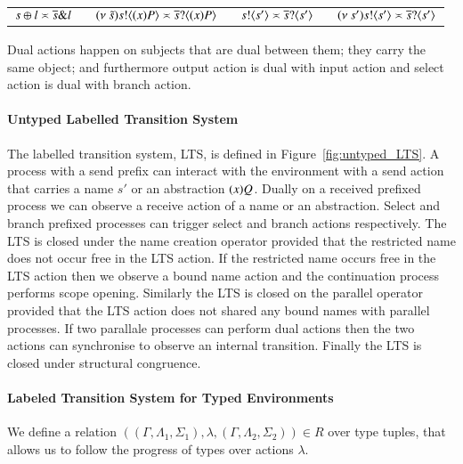 \begin{tabular}{c}
	$s \oplus l \asymp \overline{s} \& l
	\qquad (\nu\ \tilde{s}) s ! \langle (x)P \rangle \asymp \overline{s} ? \langle (x)P \rangle
	\qquad s ! \langle s' \rangle \asymp \overline{s} ? \langle s' \rangle
	\qquad (\nu\ s') s ! \langle s' \rangle \asymp \overline{s} ? \langle s' \rangle$
\end{tabular}

Dual actions happen on subjects that are dual between them; they carry the same
object; and furthermore output action is dual with input action and 
select action is dual with branch action.

\paragraph{Untyped Labelled Transition System}



The labelled transition system, LTS, is defined in Figure~\ref{fig:untyped_LTS}.
A process with a send prefix can interact with the environment with a send
action that carries a name $s'$ or an abstraction $(x)Q$. Dually
on a received prefixed process we can observe a receive action of a name or
an abstraction. Select and branch prefixed processes can trigger select
and branch actions respectively. The LTS is closed under the name creation
operator provided that the restricted name does not occur free in the LTS action.
If the restricted name occurs free in the LTS action then we observe a bound name
action and the continuation process performs scope opening. Similarly the LTS 
is closed on the parallel operator provided that the LTS action does not shared
any bound names with parallel processes. If two parallale processes can perform
dual actions then the two actions can synchronise to observe an internal transition.
Finally the LTS is closed under structural congruence.


\paragraph{Labeled Transition System for Typed Environments}

We define a relation
$((\Gamma, \Lambda_1, \Sigma_1), \lambda, (\Gamma, \Lambda_2, \Sigma_2)) \in R$
over type tuples, that allows us to follow the progress of types over actions $\lambda$.




